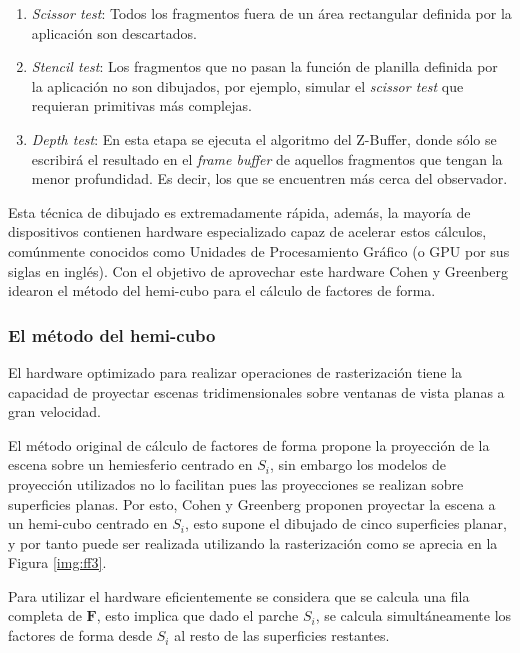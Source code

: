 \begin{enumerate}
\begin{enumerate}
			\item \textit{Scissor test}: Todos los fragmentos fuera de un área rectangular definida por la aplicación son descartados.
			\item \textit{Stencil test}: Los fragmentos que no pasan la función de planilla definida por la aplicación no son dibujados, por ejemplo, simular el \textit{scissor test} que requieran primitivas más complejas.
			\item \textit{Depth test}: En esta etapa se ejecuta el algoritmo del Z-Buffer, donde sólo se escribirá el resultado en el \textit{frame buffer} de aquellos fragmentos que tengan la menor profundidad. Es decir, los que se encuentren más cerca del observador.
		\end{enumerate}
\end{enumerate}

Esta técnica de dibujado es extremadamente rápida, además, la mayoría de dispositivos contienen hardware especializado capaz de acelerar estos cálculos, comúnmente conocidos como Unidades de Procesamiento Gráfico (o GPU por sus siglas en inglés). Con el objetivo de aprovechar este hardware Cohen y Greenberg \cite{Cohen} idearon el método del hemi-cubo para el cálculo de factores de forma.

\subsubsection{El método del hemi-cubo}

El hardware optimizado para realizar operaciones de rasterización tiene la capacidad de proyectar escenas tridimensionales sobre ventanas de vista planas a gran velocidad. 

El método original de cálculo de factores de forma propone la proyección de la escena sobre un hemiesferio centrado en $S_{i}$, sin embargo los modelos de proyección utilizados no lo facilitan pues las proyecciones se realizan sobre superficies planas. Por esto, Cohen y Greenberg \cite{Cohen} proponen proyectar la escena a un hemi-cubo centrado en $S_{i}$, esto supone el dibujado de cinco superficies planar, y por tanto puede ser realizada utilizando la rasterización como se aprecia en la Figura \ref{img:ff3}.

Para utilizar el hardware eficientemente se considera que se calcula una fila completa de $\mathbf{F}$, esto implica que dado el parche $S_{i}$, se calcula simultáneamente los factores de forma desde $S_{i}$ al resto de las superficies restantes. 

